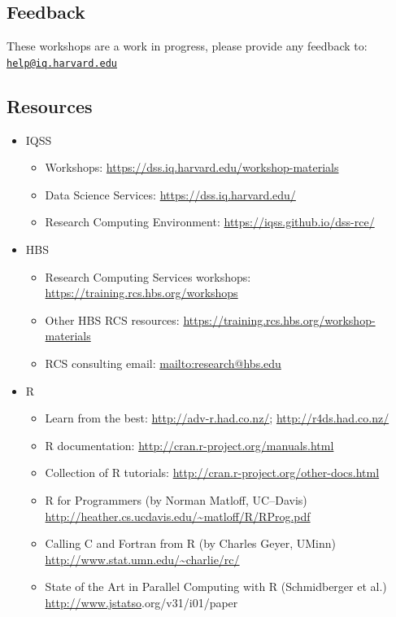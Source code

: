 \documentclass[]{book}
\providecommand{\tightlist}{%
  \setlength{\itemsep}{0pt}\setlength{\parskip}{0pt}}
\begin{document}
\hypertarget{feedback-4}{%
\subsection{Feedback}\label{feedback-4}}

These workshops are a work in progress, please provide any feedback to: \href{mailto:help@iq.harvard.edu}{\nolinkurl{help@iq.harvard.edu}}

\hypertarget{resources-5}{%
\subsection{Resources}\label{resources-5}}

\begin{itemize}
\tightlist
\item
  IQSS

  \begin{itemize}
  \tightlist
  \item
    Workshops: \url{https://dss.iq.harvard.edu/workshop-materials}
  \item
    Data Science Services: \url{https://dss.iq.harvard.edu/}
  \item
    Research Computing Environment: \url{https://iqss.github.io/dss-rce/}
  \end{itemize}
\item
  HBS

  \begin{itemize}
  \tightlist
  \item
    Research Computing Services workshops: \url{https://training.rcs.hbs.org/workshops}
  \item
    Other HBS RCS resources: \url{https://training.rcs.hbs.org/workshop-materials}
  \item
    RCS consulting email: \url{mailto:research@hbs.edu}
  \end{itemize}
\item
  R

  \begin{itemize}
  \tightlist
  \item
    Learn from the best: \url{http://adv-r.had.co.nz/}; \url{http://r4ds.had.co.nz/}
  \item
    R documentation: \url{http://cran.r-project.org/manuals.html}
  \item
    Collection of R tutorials: \url{http://cran.r-project.org/other-docs.html}
  \item
    R for Programmers (by Norman Matloff, UC--Davis) \url{http://heather.cs.ucdavis.edu/~matloff/R/RProg.pdf}
  \item
    Calling C and Fortran from R (by Charles Geyer, UMinn) \url{http://www.stat.umn.edu/~charlie/rc/}
  \item
    State of the Art in Parallel Computing with R (Schmidberger et al.) \url{http://www.jstatso}\textbar.org/v31/i01/paper
  \end{itemize}
\end{itemize}
\end{document}
